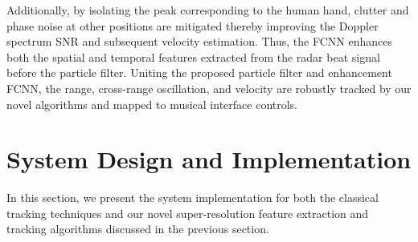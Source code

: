 \documentclass[10pt,journal,final]{IEEEtran}
\begin{document}

Additionally, by isolating the peak corresponding to the human hand, clutter and phase noise at other positions are mitigated thereby improving the Doppler spectrum SNR and subsequent velocity estimation.
Thus, the FCNN enhances both the spatial and temporal features extracted from the radar beat signal before the particle filter.
Uniting the proposed particle filter and enhancement FCNN, the range, cross-range oscillation, and velocity are robustly tracked by our novel algorithms and mapped to musical interface controls.


\section{System Design and Implementation}
\label{sec:system_design_and_implementation}
In this section, we present the system implementation for both the classical tracking techniques and our novel super-resolution feature extraction and tracking algorithms discussed in the previous section.
\end{document}
